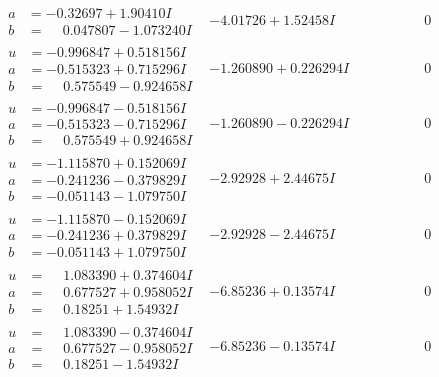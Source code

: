 \documentclass[1p]{elsarticle_modified}
\theoremstyle{definition}
\begin{document}
$$\begin{array}{c|c|c}
\begin{aligned}
a &= -0.32697 + 1.90410 I \\
b &= \phantom{-}0.047807 - 1.073240 I\end{aligned}
 & -4.01726 + 1.52458 I & \phantom{-0.000000 } 0 \\ \hline\begin{aligned}
u &= -0.996847 + 0.518156 I \\
a &= -0.515323 + 0.715296 I \\
b &= \phantom{-}0.575549 - 0.924658 I\end{aligned}
 & -1.260890 + 0.226294 I & \phantom{-0.000000 } 0 \\ \hline\begin{aligned}
u &= -0.996847 - 0.518156 I \\
a &= -0.515323 - 0.715296 I \\
b &= \phantom{-}0.575549 + 0.924658 I\end{aligned}
 & -1.260890 - 0.226294 I & \phantom{-0.000000 } 0 \\ \hline\begin{aligned}
u &= -1.115870 + 0.152069 I \\
a &= -0.241236 - 0.379829 I \\
b &= -0.051143 - 1.079750 I\end{aligned}
 & -2.92928 + 2.44675 I & \phantom{-0.000000 } 0 \\ \hline\begin{aligned}
u &= -1.115870 - 0.152069 I \\
a &= -0.241236 + 0.379829 I \\
b &= -0.051143 + 1.079750 I\end{aligned}
 & -2.92928 - 2.44675 I & \phantom{-0.000000 } 0 \\ \hline\begin{aligned}
u &= \phantom{-}1.083390 + 0.374604 I \\
a &= \phantom{-}0.677527 + 0.958052 I \\
b &= \phantom{-}0.18251 + 1.54932 I\end{aligned}
 & -6.85236 + 0.13574 I & \phantom{-0.000000 } 0 \\ \hline\begin{aligned}
u &= \phantom{-}1.083390 - 0.374604 I \\
a &= \phantom{-}0.677527 - 0.958052 I \\
b &= \phantom{-}0.18251 - 1.54932 I\end{aligned}
 & -6.85236 - 0.13574 I & \phantom{-0.000000 } 0 \\ \hline\begin{aligned}

\end{aligned}
\end{array}$$
\end{document}
